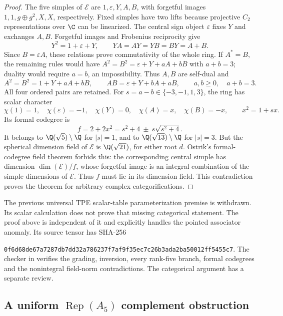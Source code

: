 \begin{proof}
The five simples of $\mathcal E$ are $1,\varepsilon,Y,A,B$, with
forgetful images $1,1,g\oplus g^2,X,X$, respectively. Fixed simples
have two lifts because projective $C_2$ representations over $\C$ can
be linearized. The central sign object $\varepsilon$ fixes $Y$ and
exchanges $A,B$. Forgetful images and Frobenius reciprocity give
\[
Y^2=1+\varepsilon+Y,\qquad YA=AY=YB=BY=A+B.
\]
Since $B=\varepsilon A$, these relations prove commutativity of the
whole ring. If $A^*=B$, the remaining rules would have
$A^2=B^2=\varepsilon+Y+aA+bB$ with $a+b=3$; duality would require
$a=b$, an impossibility. Thus $A,B$ are self-dual and
\[
A^2=B^2=1+Y+aA+bB,\qquad
AB=\varepsilon+Y+bA+aB,\qquad a,b\geq0,\quad a+b=3.
\]
All four ordered pairs are retained. For $s=a-b\in\{-3,-1,1,3\}$,
the ring has scalar character
\[
\chi(1)=1,\quad\chi(\varepsilon)=-1,\quad\chi(Y)=0,
\quad\chi(A)=x,\quad\chi(B)=-x,\qquad x^2=1+sx.
\]
Its formal codegree is
\[
f=2+2x^2=s^2+4\ \pm\ s\sqrt{s^2+4}.
\]
It belongs to $\Q(\sqrt5)\setminus\Q$ for $|s|=1$, and to
$\Q(\sqrt{13})\setminus\Q$ for $|s|=3$. But the spherical dimension
field of $\mathcal E$ is $\Q(\sqrt{21})$, for either root $d$.
Ostrik's formal-codegree field theorem
\cite[Theorem~2.13 and Corollary~2.15]{OstrikPiv3} forbids this: the
corresponding central simple has dimension $\dim(\mathcal E)/f$, whose
forgetful image is an integral combination of the simple dimensions of
$\mathcal E$. Thus $f$ must lie in its dimension field. This contradiction
proves the theorem for arbitrary complex categorifications.
\end{proof}
\begin{remark}
The previous universal TPE scalar-table parameterization premise is
withdrawn. Its scalar calculation does not prove that missing categorical
statement. The proof above is independent of it and explicitly handles
the pointed associator anomaly. Its source tensor has SHA-256
\par\noindent\nolinkurl{0f6d68de67a7287db7dd32a786237f7af9f35ec7c26b3ada2ba50012ff5455c7}.
The checker in  verifies the grading,
inversion, every rank-five branch, formal codegrees and the nonintegral
field-norm contradictions. The categorical argument has a separate review.
\end{remark}

\subsection{A uniform $\operatorname{Rep}(A_5)$ complement obstruction}
\label{sec:rank8-a5-complement}

